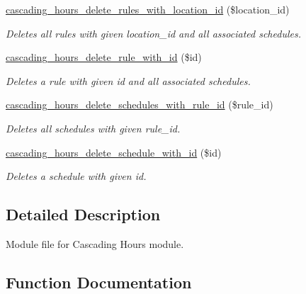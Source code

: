 \begin{DoxyCompactItemize}
\hyperlink{cascading__hours_8module_afb498014eb8e81b0d700f8d469c164b5_afb498014eb8e81b0d700f8d469c164b5}{cascading\+\_\+hours\+\_\+delete\+\_\+rules\+\_\+with\+\_\+location\+\_\+id} (\$location\+\_\+id)
\begin{DoxyCompactList}\small\item\em Deletes all rules with given location\+\_\+id and all associated schedules. \end{DoxyCompactList}\item 
\hyperlink{cascading__hours_8module_a98cf420bdfcbcd3cb3836052c256fd0e_a98cf420bdfcbcd3cb3836052c256fd0e}{cascading\+\_\+hours\+\_\+delete\+\_\+rule\+\_\+with\+\_\+id} (\$id)
\begin{DoxyCompactList}\small\item\em Deletes a rule with given id and all associated schedules. \end{DoxyCompactList}\item 
\hyperlink{cascading__hours_8module_ae32cff1d7b513e0d0ca72aac20938052_ae32cff1d7b513e0d0ca72aac20938052}{cascading\+\_\+hours\+\_\+delete\+\_\+schedules\+\_\+with\+\_\+rule\+\_\+id} (\$rule\+\_\+id)
\begin{DoxyCompactList}\small\item\em Deletes all schedules with given rule\+\_\+id. \end{DoxyCompactList}\item 
\hyperlink{cascading__hours_8module_a44f3de6cd9b87543d715932c6d0441c6_a44f3de6cd9b87543d715932c6d0441c6}{cascading\+\_\+hours\+\_\+delete\+\_\+schedule\+\_\+with\+\_\+id} (\$id)
\begin{DoxyCompactList}\small\item\em Deletes a schedule with given id. \end{DoxyCompactList}\end{DoxyCompactItemize}


\subsection{Detailed Description}
Module file for Cascading Hours module. 



\subsection{Function Documentation}
\mbox{\label{cascading__hours_8module_a36f591276bcee018760ce7db1af962e5_a36f591276bcee018760ce7db1af962e5}} 
